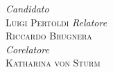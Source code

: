 \documentclass[11pt, a4paper]{book}
\begin{document}
\begin{titlepage}
	\vspace{3cm}
	\begin{multicols}{2}
	\noindent
	\textsl{Candidato} \\
	\textsc{Luigi Pertoldi}
	\columnbreak
	\flushright
	\textsl{Relatore} \\
	\textsc{Riccardo Brugnera} \\
	\vspace{5mm}
	\textsl{Corelatore} \\
	\textsc{Katharina von Sturm}
	\end{multicols}
\end{titlepage}
\tableofcontents
%
%



\end{document}
